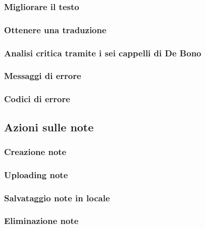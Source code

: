 \documentclass[a4paper, 10pt, colorlinks=true, linkcolor=black, urlcolor=blue, citecolor=blue, hidelinks]{article}
\begin{document}
\subsubsection{Migliorare il testo}

\subsubsection{Ottenere una traduzione}

\subsubsection{Analisi critica tramite i sei cappelli di De Bono}

\subsubsection{Messaggi di errore}

\subsubsection{Codici di errore}

\subsection{Azioni sulle note}

\subsubsection{Creazione note}

\subsubsection{Uploading note}

\subsubsection{Salvataggio note in locale}

\subsubsection{Eliminazione note}
\end{document}
